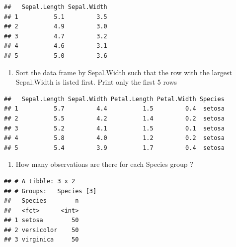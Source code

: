 \documentclass[]{book}
\newenvironment{Shaded}{\begin{snugshade}}{\end{snugshade}}
\newcommand{\DecValTok}[1]{\textcolor[rgb]{0.00,0.00,0.81}{#1}}
\newcommand{\KeywordTok}[1]{\textcolor[rgb]{0.13,0.29,0.53}{\textbf{#1}}}
\newcommand{\NormalTok}[1]{#1}
\newcommand{\OperatorTok}[1]{\textcolor[rgb]{0.81,0.36,0.00}{\textbf{#1}}}
\newcommand{\StringTok}[1]{\textcolor[rgb]{0.31,0.60,0.02}{#1}}
\providecommand{\tightlist}{%
  \setlength{\itemsep}{0pt}\setlength{\parskip}{0pt}}
\begin{document}
\begin{verbatim}
##   Sepal.Length Sepal.Width
## 1          5.1         3.5
## 2          4.9         3.0
## 3          4.7         3.2
## 4          4.6         3.1
## 5          5.0         3.6
\end{verbatim}

\begin{enumerate}
\def\labelenumi{\arabic{enumi})}
\setcounter{enumi}{2}
\tightlist
\item
  Sort the data frame by Sepal.Width such that the row with the largest Sepal.Width is listed first. Print only the first 5 rows
\end{enumerate}

\begin{Shaded}
\end{Shaded}

\begin{verbatim}
##   Sepal.Length Sepal.Width Petal.Length Petal.Width Species
## 1          5.7         4.4          1.5         0.4  setosa
## 2          5.5         4.2          1.4         0.2  setosa
## 3          5.2         4.1          1.5         0.1  setosa
## 4          5.8         4.0          1.2         0.2  setosa
## 5          5.4         3.9          1.7         0.4  setosa
\end{verbatim}

\begin{enumerate}
\def\labelenumi{\arabic{enumi})}
\setcounter{enumi}{3}
\tightlist
\item
  How many observations are there for each Species group ?
\end{enumerate}

\begin{Shaded}
\end{Shaded}

\begin{verbatim}
## # A tibble: 3 x 2
## # Groups:   Species [3]
##   Species        n
##   <fct>      <int>
## 1 setosa        50
## 2 versicolor    50
## 3 virginica     50
\end{verbatim}
\end{document}
